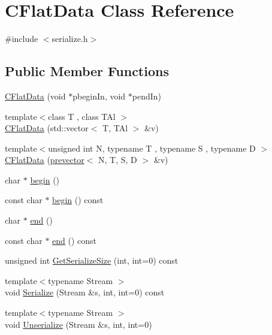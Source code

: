 \hypertarget{class_c_flat_data}{}\section{C\+Flat\+Data Class Reference}
\label{class_c_flat_data}


{\ttfamily \#include $<$serialize.\+h$>$}

\subsection*{Public Member Functions}
\begin{DoxyCompactItemize}
\item 
\mbox{\hyperlink{class_c_flat_data_afd4036c45c69e6b080f57d793e1bdf57}{C\+Flat\+Data}} (void $\ast$pbegin\+In, void $\ast$pend\+In)
\item 
{\footnotesize template$<$class T , class T\+Al $>$ }\\\mbox{\hyperlink{class_c_flat_data_aa536a3fe59b6cde08cf7ed57ecebedfb}{C\+Flat\+Data}} (std\+::vector$<$ T, T\+Al $>$ \&v)
\item 
{\footnotesize template$<$unsigned int N, typename T , typename S , typename D $>$ }\\\mbox{\hyperlink{class_c_flat_data_a050219ab3d7035ab56cf1de842eb74c6}{C\+Flat\+Data}} (\mbox{\hyperlink{classprevector}{prevector}}$<$ N, T, S, D $>$ \&v)
\item 
char $\ast$ \mbox{\hyperlink{class_c_flat_data_ac8131cc3aec84905d7786fb19ff8953d}{begin}} ()
\item 
const char $\ast$ \mbox{\hyperlink{class_c_flat_data_a0c771a8143c468a9f7add8b3d9736212}{begin}} () const
\item 
char $\ast$ \mbox{\hyperlink{class_c_flat_data_ae88ae9f4121ff18aa8e29a3a40d7ee67}{end}} ()
\item 
const char $\ast$ \mbox{\hyperlink{class_c_flat_data_af5c2476dcbc0ec0d4f9051df3cdb756d}{end}} () const
\item 
unsigned int \mbox{\hyperlink{class_c_flat_data_ae47ed62d67cc6d923d6c8f9dde7a940c}{Get\+Serialize\+Size}} (int, int=0) const
\item 
{\footnotesize template$<$typename Stream $>$ }\\void \mbox{\hyperlink{class_c_flat_data_a97449211175d7fbbb88830cbba808132}{Serialize}} (Stream \&s, int, int=0) const
\item 
{\footnotesize template$<$typename Stream $>$ }\\void \mbox{\hyperlink{class_c_flat_data_a3da79327bf2937113de502182ee227b9}{Unserialize}} (Stream \&s, int, int=0)
\end{DoxyCompactItemize}
